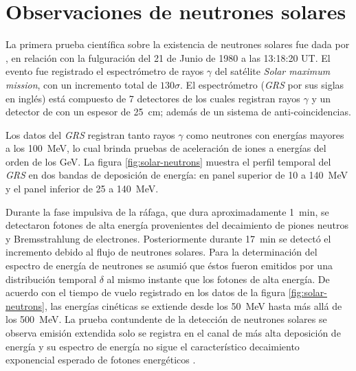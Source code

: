 \section{Observaciones de neutrones solares}

La primera prueba científica sobre la existencia de neutrones solares fue dada por \cite{chupp82}, en relación con la fulguración del \num{21} de Junio de \num{1980} a las 13:18:20 UT. El evento fue registrado el espectrómetro de rayos $\gamma$ del satélite \emph{Solar maximum mission}, con un incremento total de $130\sigma$. El espectrómetro (\emph{GRS} por sus siglas en inglés) está compuesto de \num{7} detectores de  los cuales registran rayos $\gamma$ y un detector de  con un espesor de \SI{25}{\centi\metre}; además de un sistema de anti-coincidencias.

Los datos del \emph{GRS} registran tanto rayos $\gamma$ como neutrones con energías mayores a los \SI{100}{\mega\electronvolt}, lo cual brinda pruebas de aceleración de iones a energías del orden de los \si{\giga\electronvolt}. La figura \ref{fig:solar-neutrons} muestra el perfil temporal del \emph{GRS} en dos bandas de deposición de energía: en panel superior de \num{10} a \SI{140}{\mega\electronvolt} y el panel inferior de \num{25} a \SI{140}{\mega\electronvolt}.

Durante la fase impulsiva de la ráfaga, que dura aproximadamente \SI{1}{\minute}, se detectaron fotones de alta energía provenientes del decaimiento de piones neutros y Bremsstrahlung de electrones. Posteriormente durante \SI{17}{\minute} se detectó el incremento debido al flujo de neutrones solares. Para la determinación del espectro de energía de neutrones se asumió que éstos fueron emitidos por una distribución temporal $\delta$ al mismo instante que los fotones de alta energía. De acuerdo con el tiempo de vuelo registrado en los datos de la figura \ref{fig:solar-neutrons}, las energías cinéticas se extiende desde los \SI{50}{\mega\electronvolt} hasta más allá de los \SI{500}{\mega\electronvolt}. La prueba contundente de la detección de neutrones solares se observa emisión extendida solo se registra en el canal de más alta deposición de energía y su espectro de energía no sigue el característico decaimiento exponencial esperado de fotones energéticos \cite{dorman}.

